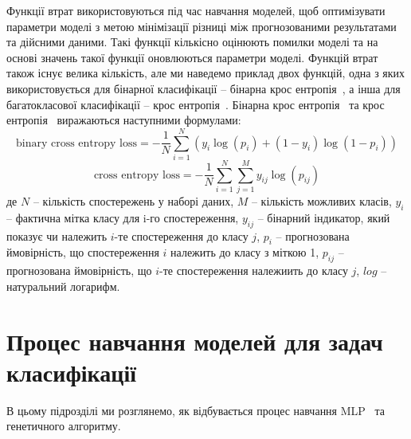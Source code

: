 Функції втрат використовуються під час навчання моделей, щоб оптимізувати параметри моделі з метою мінімізації різниці між прогнозованими результатами та дійсними даними. Такі функції кількісно оцінюють помилки моделі та на основі значень такої функції оновлюються параметри моделі. Функцій втрат також існує велика кількість, але ми наведемо приклад двох функцій, одна з яких використовується для бінарної класифікації -- бінарна крос ентропія~\cite{ct27}, а інша для багатокласової класифікації -- крос ентропія~\cite{ct28}. Бінарна крос ентропія~\cite{ct27} та крос ентропія~\cite{ct28} виражаються наступними формулами:
\begin{equation}
	\label{eq:binary_cross_entropy}
	\text{binary cross entropy loss} = -\frac{1}{N} \sum_{i=1}^{N} \left( y_i \log(p_i) + (1 - y_i) \log(1 - p_i) \right)
\end{equation}
\begin{equation}
	\label{eq:cross_entropy}
	\text{cross entropy loss} = -\frac{1}{N} \sum_{i=1}^{N} \sum_{j=1}^{M} y_{ij} \log(p_{ij})
\end{equation}
де $N$ -- кількість спостережень у наборі даних, $M$ -- кількість можливих класів, $y_i$ -- фактична мітка класу для i-го спостереження, $y_{ij}$ -- бінарний індикатор, який показує чи належить $i$-те спостереження до класу $j$, $p_i$ -- прогнозована ймовірність, що спостереження $i$ належить до класу з міткою 1, $p_{ij}$ -- прогнозована ймовірність, що $i$-те спостереження належиить до класу $j$, $log$ -- натуральний логарифм.

\section{Процес навчання моделей для задач класифікації}\label{sec:training_process}


В цьому підрозділі ми розглянемо, як відбувається процес навчання MLP~\cite{ct26} та генетичного алгоритму.


